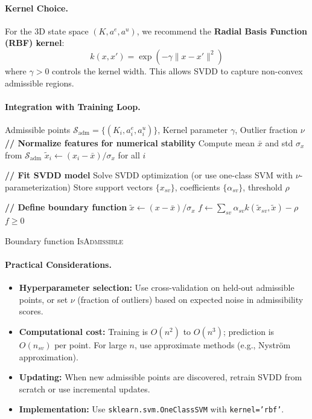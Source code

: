 \paragraph{Kernel Choice.}
For the 3D state space $(K, a^e, a^u)$, we recommend the \textbf{Radial Basis Function (RBF) kernel}:
\begin{equation}
    k(x, x') = \exp\left(-\gamma \|x - x'\|^2\right)
\end{equation}
where $\gamma > 0$ controls the kernel width. This allows SVDD to capture non-convex admissible regions.

\paragraph{Integration with Training Loop.}

\begin{algorithm}[H]
\caption{SVDD-Based Boundary Learning}
\label{alg:svdd_boundary}
\begin{algorithmic}[1]
\Require Admissible points $\mathcal{S}_{\text{adm}} = \{(K_i, a^e_i, a^u_i)\}$, Kernel parameter $\gamma$, Outlier fraction $\nu$
\State \textbf{// Normalize features for numerical stability}
\State Compute mean $\bar{x}$ and std $\sigma_x$ from $\mathcal{S}_{\text{adm}}$
\State $\tilde{x}_i \gets (x_i - \bar{x}) / \sigma_x$ for all $i$

\State
\State \textbf{// Fit SVDD model}
\State Solve SVDD optimization (or use one-class SVM with $\nu$-parameterization)
\State Store support vectors $\{x_{sv}\}$, coefficients $\{\alpha_{sv}\}$, threshold $\rho$

\State
\State \textbf{// Define boundary function}
    \State $\tilde{x} \gets (x - \bar{x}) / \sigma_x$
    \State $f \gets \sum_{sv} \alpha_{sv} k(\tilde{x}_{sv}, \tilde{x}) - \rho$
    \State \Return $f \geq 0$
\EndFunction

\State \Return Boundary function \textsc{IsAdmissible}
\end{algorithmic}
\end{algorithm}

\paragraph{Practical Considerations.}
\begin{itemize}
    \item \textbf{Hyperparameter selection:} Use cross-validation on held-out admissible points, or set $\nu$ (fraction of outliers) based on expected noise in admissibility scores.
    \item \textbf{Computational cost:} Training is $O(n^2)$ to $O(n^3)$; prediction is $O(n_{sv})$ per point. For large $n$, use approximate methods (e.g., Nyström approximation).
    \item \textbf{Updating:} When new admissible points are discovered, retrain SVDD from scratch or use incremental updates.
    \item \textbf{Implementation:} Use \texttt{sklearn.svm.OneClassSVM} with \texttt{kernel='rbf'}.
\end{itemize}

